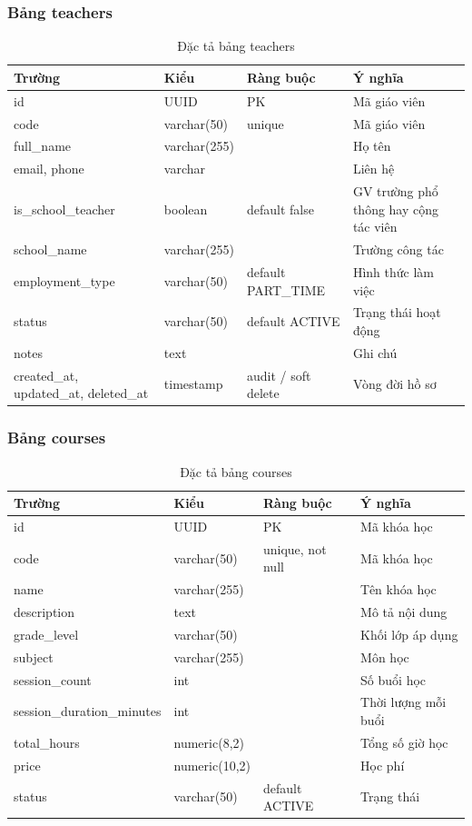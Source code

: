 \documentclass[../DoAn.tex]{subfiles}
\begin{document}
\subsubsection{Bảng teachers}
\begin{table}[H]
\centering
\caption{Đặc tả bảng teachers}
\scriptsize
\begin{tabular}{|l|l|p{3cm}|p{3.5cm}|}
\hline
\textbf{Trường} & \textbf{Kiểu} & \textbf{Ràng buộc} & \textbf{Ý nghĩa} \\ \hline
id & UUID & PK & Mã giáo viên \\ \hline
code & varchar(50) & unique & Mã giáo viên \\ \hline
full\_name & varchar(255) & & Họ tên \\ \hline
email, phone & varchar & & Liên hệ \\ \hline
is\_school\_teacher & boolean & default false & GV trường phổ thông hay cộng tác viên \\ \hline
school\_name & varchar(255) & & Trường công tác \\ \hline
employment\_type & varchar(50) & default PART\_TIME & Hình thức làm việc \\ \hline
status & varchar(50) & default ACTIVE & Trạng thái hoạt động \\ \hline
notes & text & & Ghi chú \\ \hline
created\_at, updated\_at, deleted\_at & timestamp & audit / soft delete & Vòng đời hồ sơ \\ \hline
\end{tabular}
\end{table}

\subsubsection{Bảng courses}
\begin{table}[H]
\centering
\caption{Đặc tả bảng courses}
\scriptsize
\begin{tabular}{|l|l|l|p{4cm}|}
\hline
\textbf{Trường} & \textbf{Kiểu} & \textbf{Ràng buộc} & \textbf{Ý nghĩa} \\ \hline
id & UUID & PK & Mã khóa học \\ \hline
code & varchar(50) & unique, not null & Mã khóa học \\ \hline
name & varchar(255) & & Tên khóa học \\ \hline
description & text & & Mô tả nội dung \\ \hline
grade\_level & varchar(50) & & Khối lớp áp dụng \\ \hline
subject & varchar(255) & & Môn học \\ \hline
session\_count & int & & Số buổi học \\ \hline
session\_duration\_minutes & int & & Thời lượng mỗi buổi \\ \hline
total\_hours & numeric(8,2) & & Tổng số giờ học \\ \hline
price & numeric(10,2) & & Học phí \\ \hline
status & varchar(50) & default ACTIVE & Trạng thái \\ \hline
\end{tabular}
\end{table}
\end{document}

